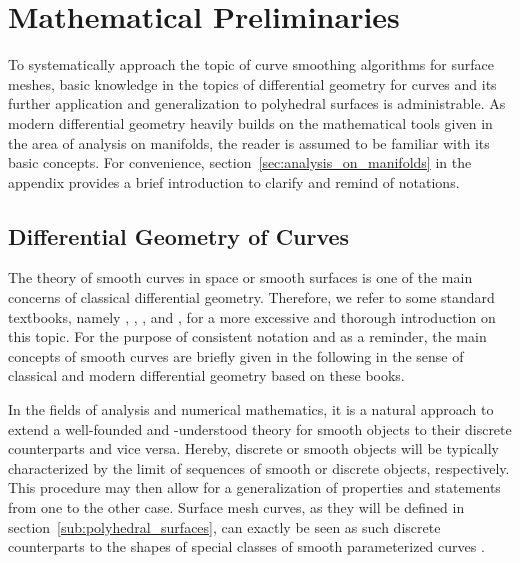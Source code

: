 \documentclass{stdlocal}
\begin{document}
\section{Mathematical Preliminaries} %
\label{sec:preliminaries}

To systematically approach the topic of curve smoothing algorithms for surface meshes, basic knowledge in the topics of differential geometry for curves and its further application and generalization to polyhedral surfaces is administrable.
As modern differential geometry heavily builds on the mathematical tools given in the area of analysis on manifolds, the reader is assumed to be familiar with its basic concepts.
For convenience, section~\ref{sec:analysis_on_manifolds} in the appendix provides a brief introduction to clarify and remind of notations.

\subsection{Differential Geometry of Curves} %
\label{sub:differential_geometry}

  The theory of smooth curves in space or smooth surfaces is one of the main concerns of classical differential geometry.
  Therefore, we refer to some standard textbooks, namely \textcite{goldhorn2009}, \textcite{carmo2016}, \textcite{kuehnel2013}, and \textcite{stahl2013}, for a more excessive and thorough introduction on this topic.
  For the purpose of consistent notation and as a reminder, the main concepts of smooth curves are briefly given in the following in the sense of classical and modern differential geometry based on these books.

  In the fields of analysis and numerical mathematics, it is a natural approach to extend a well-founded and -understood theory for smooth objects to their discrete counterparts and vice versa.
  Hereby, discrete or smooth objects will be typically characterized by the limit of sequences of smooth or discrete objects, respectively.
  This procedure may then allow for a generalization of properties and statements from one to the other case.
  Surface mesh curves, as they will be defined in section~\ref{sub:polyhedral_surfaces}, can exactly be seen as such discrete counterparts to the shapes of special classes of smooth parameterized curves \autocite{polthier2006}. \\
  \autocite{forster2016,elstrodt2011,cheney2008,goldhorn2009}
\end{document}
